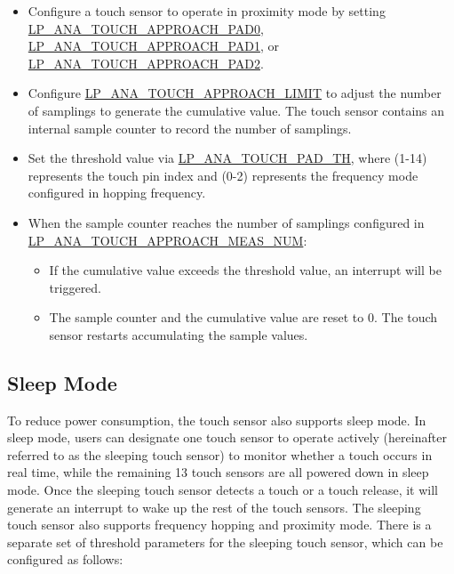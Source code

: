 \documentclass[main\_\_EN.tex]{subfiles}
\begin{document}
\begin{itemize}
    \item Configure a touch sensor to operate in proximity mode by setting \hyperref[fielddesc:LPANATOUCHAPPROACHPAD0]{LP\_ANA\_TOUCH\_APPROACH\_PAD0}, \hyperref[fielddesc:LPANATOUCHAPPROACHPAD1]{LP\_ANA\_TOUCH\_APPROACH\_PAD1}, or \hyperref[fielddesc:LPANATOUCHAPPROACHPAD2]{LP\_ANA\_TOUCH\_APPROACH\_PAD2}.
    \item Configure \hyperref[fielddesc:LPANATOUCHAPPROACHLIMIT]{LP\_ANA\_TOUCH\_APPROACH\_LIMIT} to adjust the number of samplings to generate the cumulative value. The touch sensor contains an internal sample counter to record the number of samplings.
    \item Set the threshold value via \hyperref[fielddesc:LPANATOUCHPAD0TH0]{LP\_ANA\_TOUCH\_PAD\_TH}, where  (1-14) represents the touch pin index and  (0-2) represents the frequency mode configured in hopping frequency.
    \item When the sample counter reaches the number of samplings configured in \hyperref[fielddesc:LPANATOUCHAPPROACHMEASNUM0]{LP\_ANA\_TOUCH\_APPROACH\_MEAS\_NUM}:
    \begin{itemize}
        \item If the cumulative value exceeds the threshold value, an interrupt will be triggered.
        \item The sample counter and the cumulative value are reset to 0. The touch sensor restarts accumulating the sample values.
    \end{itemize}
\end{itemize}

\subsection{Sleep Mode}

To reduce power consumption, the touch sensor also supports sleep mode. In sleep mode, users can designate one touch sensor to operate actively (hereinafter referred to as the sleeping touch sensor) to monitor whether a touch occurs in real time, while the remaining 13 touch sensors are all powered down in sleep mode. Once the sleeping touch sensor detects a touch or a touch release, it will generate an interrupt to wake up the rest of the touch sensors. The sleeping touch sensor also supports frequency hopping and proximity mode. There is a separate set of threshold parameters for the sleeping touch sensor, which can be configured as follows:
\end{document}
